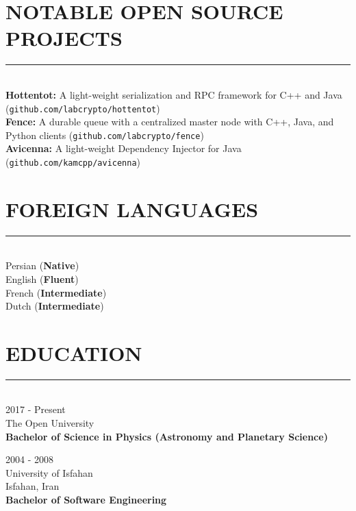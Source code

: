 \documentclass[10pt,a4paper]{article}
\begin{document}

\section{NOTABLE OPEN SOURCE PROJECTS}
\noindent \rule {18.0cm}{0.2pt} \\
    \textbullet \hspace{0.05cm} \textbf{Hottentot:} A light-weight serialization and RPC framework for C++ and Java (\texttt{github.com/labcrypto/hottentot}) \\
    \textbullet \hspace{0.05cm} \textbf{Fence:} A durable queue with a centralized master node with C++, Java, and Python clients (\texttt{github.com/labcrypto/fence}) \\
    \textbullet \hspace{0.05cm} \textbf{Avicenna:} A light-weight Dependency Injector for Java  (\texttt{github.com/kamcpp/avicenna}) \\
    
\section{FOREIGN LANGUAGES}
\noindent \rule {18.0cm}{0.2pt} \\
    \textbullet \hspace{0.05cm} Persian (\textbf{Native}) \\
    \textbullet \hspace{0.05cm} English (\textbf{Fluent}) \\
    \textbullet \hspace{0.05cm} French (\textbf{Intermediate}) \\
    \textbullet \hspace{0.05cm} Dutch (\textbf{Intermediate}) \\

\section{EDUCATION}
\noindent \rule {18.0cm}{0.2pt} \\
\textbullet \hspace{0.1cm} 2017 - Present \\
The Open University \\
\textbf{Bachelor of Science in Physics (Astronomy and Planetary Science)}
\vspace{0.3cm}

\noindent \textbullet \hspace{0.1cm}  2004 - 2008 \\
University of Isfahan \\
Isfahan, Iran \\
\textbf{Bachelor of Software Engineering}
\end{document}
